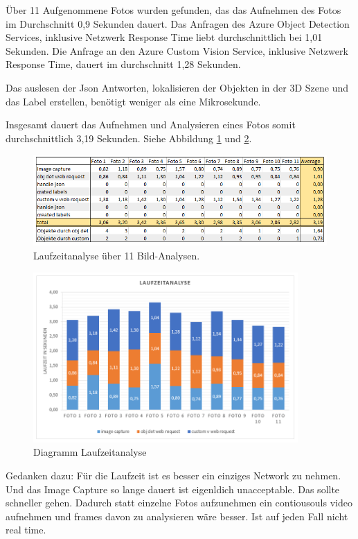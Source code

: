 Über 11 Aufgenommene Fotos wurden gefunden, das das Aufnehmen des Fotos im Durchschnitt 0,9 Sekunden dauert. Das Anfragen des Azure Object Detection Services, inklusive Netzwerk Response Time liebt durchschnittlich bei 1,01 Sekunden. Die Anfrage an den Azure Custom Vision Service, inklusive Netzwerk Response Time, dauert im durchschnitt 1,28 Sekunden. 

Das auslesen der Json Antworten, lokalisieren der Objekten in der 3D Szene und das Label erstellen, benötigt weniger als eine Mikrosekunde.

Insgesamt dauert das Aufnehmen und Analysieren eines Fotos somit durchschnittlich 3,19 Sekunden. Siehe Abbildung \ref{table:laufzeitanalyse} und \ref{table:laufzeitanalyse2}.

\begin{figure}[H]
	\centering
	\includegraphics[width=1\textwidth]{images/table_Laufzeitanalyse.PNG}
	\caption[]{Laufzeitanalyse über 11 Bild-Analysen.}
	\label{table:laufzeitanalyse}
\end{figure}

\begin{figure}[H]
	\centering
	\includegraphics[width=0.9\textwidth]{images/table_Laufzeitanalyse2.PNG}
	\caption[]{Diagramm Laufzeitanalyse}
	\label{table:laufzeitanalyse2}
\end{figure}

Gedanken dazu: Für die Laufzeit ist es besser ein einziges Network zu nehmen. Und das Image Capture so lange dauert ist eigenldich unacceptable. Das sollte schneller gehen. Dadurch statt einzelne Fotos aufzunehmen ein contiousouls video aufnehmen und frames davon zu analysieren wäre besser. Ist auf jeden Fall nicht real time.

